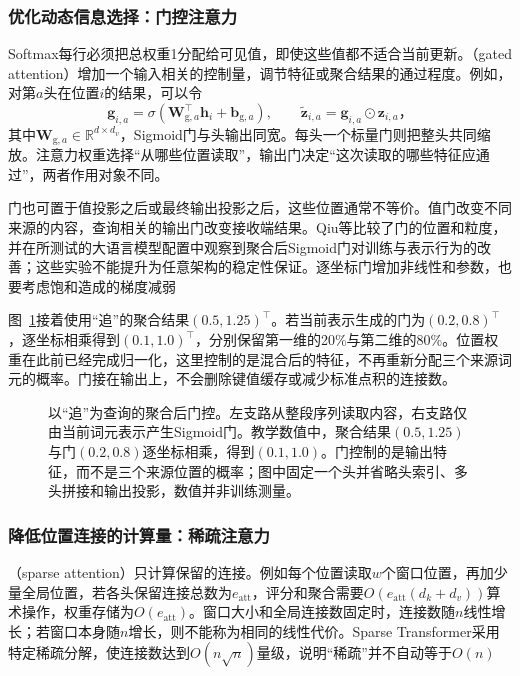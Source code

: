 \subsubsection{优化动态信息选择：门控注意力}

Softmax每行必须把总权重1分配给可见值，即使这些值都不适合当前更新。（gated attention）增加一个输入相关的控制量，调节特征或聚合结果的通过程度。例如，对第$a$头在位置$i$的结果，可以令
\begin{equation}
  \bm g_{i,a}=\sigma(\bm W_{\mathrm g,a}^{\top}\bm h_i+\bm b_{\mathrm g,a}),\qquad
  \widetilde{\bm z}_{i,a}=\bm g_{i,a}\odot\bm z_{i,a}\text{，}
  \label{eq:transformer-gated-attention}
\end{equation}
其中$\bm W_{\mathrm g,a}\in\mathbb R^{d\times d_v}$，Sigmoid门与头输出同宽。每头一个标量门则把整头共同缩放。注意力权重选择“从哪些位置读取”，输出门决定“这次读取的哪些特征应通过”，两者作用对象不同。

门也可置于值投影之后或最终输出投影之后，这些位置通常不等价。值门改变不同来源的内容，查询相关的输出门改变接收端结果。Qiu等比较了门的位置和粒度，并在所测试的大语言模型配置中观察到聚合后Sigmoid门对训练与表示行为的改善；这些实验不能提升为任意架构的稳定性保证。逐坐标门增加非线性和参数，也要考虑饱和造成的梯度减弱

图~\ref{fig:transformer-gated-attention}接着使用“追”的聚合结果$(0.5,1.25)^{\top}$。若当前表示生成的门为$(0.2,0.8)^{\top}$，逐坐标相乘得到$(0.1,1.0)^{\top}$，分别保留第一维的20\%与第二维的80\%。位置权重在此前已经完成归一化，这里控制的是混合后的特征，不再重新分配三个来源词元的概率。门接在输出上，不会删除键值缓存或减少标准点积的连接数。

\begin{figure}[htbp]
  \centering
  
  \caption{以“追”为查询的聚合后门控。左支路从整段序列读取内容，右支路仅由当前词元表示产生Sigmoid门。教学数值中，聚合结果$(0.5,1.25)$与门$(0.2,0.8)$逐坐标相乘，得到$(0.1,1.0)$。门控制的是输出特征，而不是三个来源位置的概率；图中固定一个头并省略头索引、多头拼接和输出投影，数值并非训练测量。}
  \label{fig:transformer-gated-attention}
\end{figure}
\FloatBarrier

\subsubsection{降低位置连接的计算量：稀疏注意力}

（sparse attention）只计算保留的连接。例如每个位置读取$w$个窗口位置，再加少量全局位置，若各头保留连接总数为$e_{\mathrm{att}}$，评分和聚合需要$O(e_{\mathrm{att}}(d_k+d_v))$算术操作，权重存储为$O(e_{\mathrm{att}})$。窗口大小和全局连接数固定时，连接数随$n$线性增长；若窗口本身随$n$增长，则不能称为相同的线性代价。Sparse Transformer采用特定稀疏分解，使连接数达到$O(n\sqrt n)$量级，说明“稀疏”并不自动等于$O(n)$

